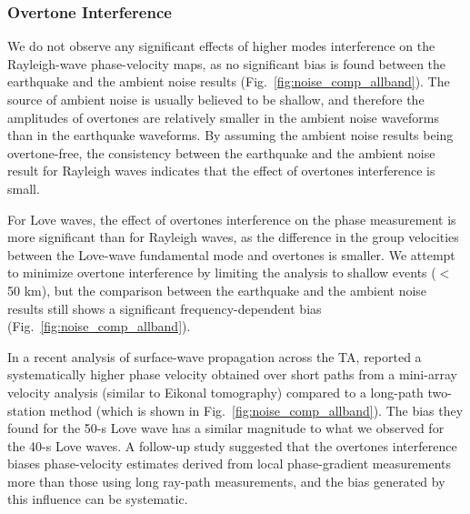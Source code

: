 



\subsubsection{Overtone Interference}
\label{sec:overtone}

We do not observe any significant effects of higher modes interference on the Rayleigh-wave phase-velocity maps, as no significant bias is found between the earthquake and the ambient noise results (Fig.~\ref{fig:noise_comp_allband}). The source of ambient noise is usually believed to be shallow, and therefore the amplitudes of overtones are relatively smaller in the ambient noise waveforms than in the earthquake waveforms. By assuming the ambient noise results being overtone-free, the consistency between the earthquake and the ambient noise result for Rayleigh waves indicates that the effect of overtones interference is small.

For Love waves, the effect of overtones interference on the phase measurement is more significant than for Rayleigh waves, as the difference in the group velocities between the Love-wave fundamental mode and overtones is smaller. We attempt to minimize overtone interference by limiting the analysis to shallow events ($<$50 km), but the comparison between the earthquake and the ambient noise results still shows a significant frequency-dependent bias (Fig.~\ref{fig:noise_comp_allband}).

In a recent analysis of surface-wave propagation across the TA, \citet{foster:2014kna} reported a systematically higher phase velocity obtained over short paths from a mini-array velocity analysis (similar to Eikonal tomography) compared to a long-path two-station method (which is shown in Fig.~\ref{fig:noise_comp_allband}). The bias they found for the 50-s Love wave has a similar magnitude to what we observed for the 40-s Love waves. A follow-up study \citep{Foster:2014wu} suggested that the overtones interference biases phase-velocity estimates derived from local phase-gradient measurements more than those using long ray-path measurements, and the bias generated by this influence can be systematic. 

